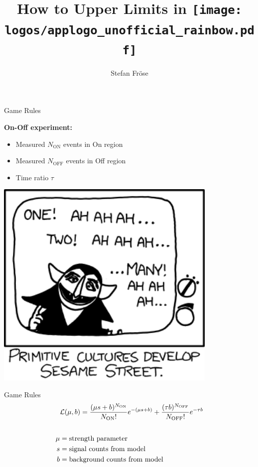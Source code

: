 \documentclass[aspectratio=1610, 9pt]{beamer}
\title{How to Upper Limits in \texttt{[image: logos/applogo\_unofficial\_rainbow.pdf]}}
\author[S.~Fröse]{Stefan Fröse}
\begin{document}
\maketitle

\begin{frame}{Game Rules}
    \begin{minipage}{0.49\textwidth}
        \Large
        \textbf{On-Off experiment:}
        \begin{itemize}
            \item Measured $N_\text{ON}$ events in On region
            \item Measured $N_\text{OFF}$ events in Off region
            \item Time ratio $\tau$
        \end{itemize}
    \end{minipage}
    \hfill
    \begin{minipage}{0.5\textwidth}
        \includegraphics[width=0.8\textwidth]{imgs/one_two.png}
    \end{minipage}
\end{frame}


\begin{frame}{Game Rules}
    \centering
    \Large
    \begin{align}
        &\mathcal{L}(\mu,b) = \frac{(\mu s + b)^{N_\text{ON}}}{N_\text{ON}!} e^{-(\mu s + b)} + \frac{(\tau b)^{N_\text{OFF}}}{N_\text{OFF}!} e^{-\tau b} \notag \\[4ex]
        \mu &= \text{strength parameter} \notag \\
        s &= \text{signal counts from model} \notag \\
        b &= \text{background counts from model}\notag 
    \end{align}
\end{frame}
\end{document}
